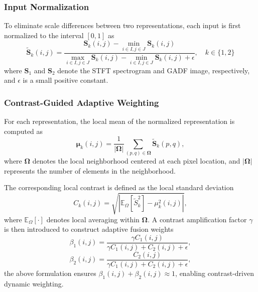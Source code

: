 \documentclass[pdflatex,sn-mathphys-num]{sn-jnl}
\theoremstyle{thmstyleone}%
\theoremstyle{thmstyletwo}%
\theoremstyle{thmstylethree}%
\begin{document}
\subsubsection{Input Normalization}

To eliminate scale differences between two representations, each input is first normalized to the interval $[0,1]$ as
\begin{equation}
	\boldsymbol{\tilde{S}}_k(i,j) = \frac{\boldsymbol{S}_k(i,j) - \min\limits_{i\in I,j\in J} \boldsymbol{S}_k(i,j)}{\max\limits_{i\in I,j\in J} \boldsymbol{S}_k(i,j) - \min\limits_{i\in I,j\in J} \boldsymbol{S}_k(i,j) + \epsilon}, \quad k\in\{1,2\}
	\label{eq:aw_input_norm}
\end{equation}
where $\boldsymbol{S}_1$ and $\boldsymbol{S}_2$ denote the STFT spectrogram and GADF image, respectively, and $\epsilon$ is a small positive constant.

\subsubsection{Contrast-Guided Adaptive Weighting}

For each representation, the local mean of the normalized representation is computed as
\begin{equation}
	\boldsymbol{\mu}_k(i,j) = \frac{1}{|\boldsymbol{\Omega}|}
	\sum_{(p,q)\in \boldsymbol{\Omega}} \boldsymbol{\tilde{S}}_k(p,q),
	\label{eq:local_mean}
\end{equation}
where $\boldsymbol{\Omega}$ denotes the local neighborhood centered at each pixel location, and $|\boldsymbol{\Omega}|$ represents the number of elements in the neighborhood.

The corresponding local contrast is defined as the local standard deviation
\begin{equation}
	C_k(i,j) = \sqrt{ \left| \mathbb{E}_\Omega \left[ \tilde{S}_k^2 \right] - \mu_k^2(i,j) \right| },
	\label{eq:local_contrast}
\end{equation}
where $\mathbb{E}_\Omega[\cdot]$ denotes local averaging within $\boldsymbol{\Omega}$. A contrast amplification factor $\gamma$ is then introduced to construct adaptive fusion weights
\begin{equation}
	\beta_1(i,j) = 
	\frac{\gamma C_1(i,j)}
	{\gamma C_1(i,j) + C_2(i,j) + \epsilon},
	\label{eq:beta1}
\end{equation}
\begin{equation}
	\beta_2(i,j) = 
	\frac{C_2(i,j)}
	{\gamma C_1(i,j) + C_2(i,j) + \epsilon},
	\label{eq:beta2}
\end{equation}
the above formulation ensures $\beta_1(i,j) + \beta_2(i,j) \approx 1$, enabling contrast-driven dynamic weighting.
\end{document}
